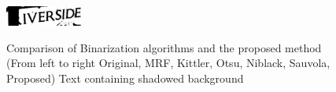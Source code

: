 \begin{figure}[t]
{\includegraphics[height=.5in,width=1in]{results/res_2/6/kit.eps}
}
\\
\label{fig:subfig11}
\caption
{Comparison of Binarization algorithms and the proposed method 
(From left to right Original, MRF, Kittler, Otsu, Niblack, Sauvola, Proposed)
Text containing shadowed background
}
\label{fig:6}
\end{figure}
